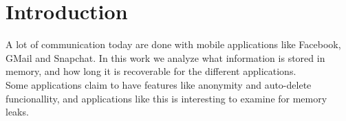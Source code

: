 \section{Introduction}
A lot of communication today are done with mobile applications like Facebook, GMail and Snapchat. In this work we analyze what information is stored in memory, and how long it is recoverable for the different applications. \\
Some applications claim to have features like anonymity and auto-delete funcionallity, and applications like this is interesting to examine for memory leaks.  